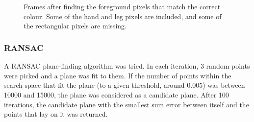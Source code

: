 \documentclass[11pt]{article}
\begin{document}
\begin{figure}
  \centering
   ~
   \\
   ~
  \caption{Frames after finding the foreground pixels that match the correct colour. Some of the hand and leg pixels are included, and some of the rectangular pixels are missing.}
  \label{fig:notbg}
\end{figure}

\subsubsection{RANSAC}
A RANSAC plane-finding algorithm was tried. In each iteration, 3 random points were picked and a plane was fit to them. If the number of points within the search space that fit the plane (to a given threshold, around 0.005) was between 10000 and 15000, the plane was considered as a candidate plane. After 100 iterations, the candidate plane with the smallest sum error between itself and the points that lay on it was returned. 
\end{document}
